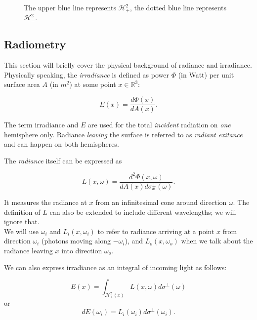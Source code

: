 \begin{figure}[ht]
	\centering
\def\svgwidth{380pt}
  
	\caption{The upper blue line represents $\mathcal{H}^2_+$, the dotted blue line represents $\mathcal{H}^2_-$.}
\label{hemi}\end{figure}

\newpage
\subsection{Radiometry}

This section will briefly cover the physical background of radiance and irradiance.\\
 Physically speaking, the \emph{irradiance} is defined as power $\Phi$ (in Watt) per unit surface area $A$ (in $m^2$) at some point $x\in\mathbb{R}^3$:

\begin{equation*}
E(x) = \frac{d\Phi(x)}{dA(x)}.
\end{equation*}

The term irradiance and $E$ are used for the total \emph{incident} radiation on \emph{one} hemisphere only. Radiance \emph{leaving} the surface is referred to as \emph{radiant exitance} and can happen on both hemispheres. 

The \emph{radiance} itself can be expressed as

\begin{equation*}
L(x,\omega) = \frac{d^2\Phi(x,\omega)}{dA(x)d\sigma^\bot_x(\omega)}.
\end{equation*}

It measures the radiance at $x$ from an infinitesimal cone around direction $\omega$. The definition of $L$ can also be extended to include different wavelengths; we will ignore that.\\
We will use $\omega_i$ and $L_i(x,\omega_i)$ to refer to radiance arriving at a point $x$ from direction $\omega_i$ (photons moving along $-\omega_i$), and $L_o(x,\omega_o)$ when we talk about the radiance leaving $x$ into direction $\omega_o$.


We can also express irradiance as an integral of incoming light as follows:

\begin{equation*}
E(x) = \int_{\mathcal{H}^2_+(x)}L(x,\omega)d\sigma^\bot(\omega)
\end{equation*}
or
\begin{equation}
\label{e and l}
dE(\omega_i) = L_i(\omega_i)d\sigma^\bot(\omega_i).
\end{equation}

